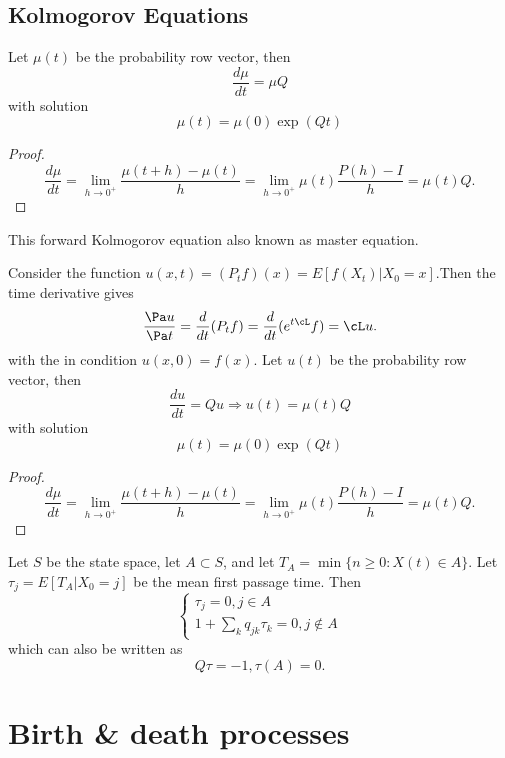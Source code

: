\begin{refsection}
\subsection{Kolmogorov Equations}
\begin{lemma}
Let $\mu(t)$ be the probability row vector, then
$$\frac{d\mu}{dt} = \mu Q $$
with solution
$$\mu(t) = \mu(0)\exp(Qt)$$
\end{lemma}
\begin{proof}
	$$\frac{d\mu}{dt} = \lim_{h\to 0^+} \frac{\mu(t+h) - \mu(t)}{h} = \lim_{h\to 0^+} \mu(t)\frac{P(h) - I}{h} = \mu(t)Q.$$
\end{proof}

\begin{remark}
This forward Kolmogorov equation also known as master equation.
\end{remark}


\begin{lemma}\cite[39]{pavliotis2014stochastic}
	Consider the function $u(x,t) = (P_tf)(x) = E[f(X_t)|X_0=x]$.Then the time derivative gives
	$$\frac{\Pa u}{\Pa t} = \frac{d}{dt}(P_tf) = \frac{d}{dt}(e^{t\cL}f) = \cL u.$$
	with the in condition $u(x,0) = f(x)$.
	Let $u(t)$ be the probability row vector, then
	$$\frac{du}{dt} = Qu \Rightarrow u(t) = \mu(t)Q$$
	with solution
	$$\mu(t) = \mu(0)\exp(Qt)$$
\end{lemma}
\begin{proof}
	$$\frac{d\mu}{dt} = \lim_{h\to 0^+} \frac{\mu(t+h) - \mu(t)}{h} = \lim_{h\to 0^+} \mu(t)\frac{P(h) - I}{h} = \mu(t)Q.$$
\end{proof}


\begin{lemma}Let $S$ be the state space, let $A\subset S$, and let $T_A = \min\{n\geq 0:X(t)\in A\}$. Let $\tau_j = E[T_A|X_0 = j]$ be the mean first passage time. 
	Then
	$$\begin{cases}
	\tau_j = 0, j\in A\\
	1 + \sum_{k} q_{jk}\tau_k = 0, j\notin A
	\end{cases}$$
which can also be written as
$$Q\tau = -1, \tau(A) = 0.$$
	
\end{lemma}




\section{Birth \& death processes}

\end{refsection}
